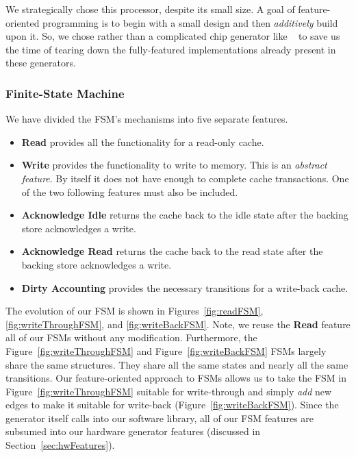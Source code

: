 \documentclass[conference]{IEEEtran}
\begin{document}
We strategically chose this processor, despite its small size. A goal of feature-oriented programming is to begin with a small design and then \emph{additively} build upon it. So, we chose \Riscvmini{} rather than a complicated chip generator like \Rocketchip{}~\cite{chisel:riscv} to save us the time of tearing down the fully-featured implementations already present in these generators.

\subsubsection{Finite-State Machine}
We have divided the FSM's mechanisms into five separate features.
\begin{itemize}
    \item \textbf{Read} provides all the functionality for a read-only cache. 
    \item \textbf{Write} provides the functionality to write to memory. This is an \emph{abstract feature}. By itself it does not have enough to complete cache transactions. One of the two following features must also be included.
    \item \textbf{Acknowledge Idle} returns the cache back to the idle state after the backing store acknowledges a write.
    \item \textbf{Acknowledge Read} returns the cache back to the read state after the backing store acknowledges a write.
    \item \textbf{Dirty Accounting} provides the necessary transitions for a write-back cache.
\end{itemize}

The evolution of our FSM is shown in Figures~\ref{fig:readFSM}, \ref{fig:writeThroughFSM}, and \ref{fig:writeBackFSM}. Note, we reuse the \textbf{Read} feature all of our FSMs without any modification. Furthermore, the Figure~\ref{fig:writeThroughFSM} and Figure~\ref{fig:writeBackFSM} FSMs largely share the same structures. They share all the same states and nearly all the same transitions. Our feature-oriented approach to FSMs allows us to take the FSM in Figure~\ref{fig:writeThroughFSM} suitable for write-through and simply \emph{add} new edges to make it suitable for write-back (Figure~\ref{fig:writeBackFSM}). Since the generator itself calls into our software library, all of our FSM features are subsumed into our hardware generator features (discussed in Section~\ref{sec:hwFeatures}). 
\end{document}
